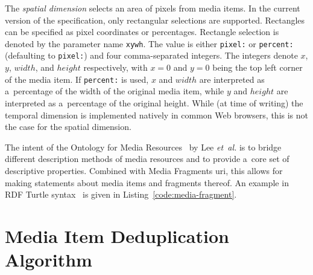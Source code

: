 \documentclass{article}
\begin{document}
The \emph{spatial dimension} selects an area of pixels from media items. In the current version of the specification, only rectangular selections are supported. Rectangles can be specified as pixel coordinates or percentages. Rectangle selection is denoted by the parameter name \texttt{xywh}. The value is either \texttt{pixel:} or \texttt{percent:} (defaulting to \texttt{pixel:}) and four comma-separated integers. The integers denote $x$, $y$, $width$, and $height$ respectively, with $x = 0$ and $y = 0$ being the top left corner of the media item. If \texttt{percent:} is used,\linebreak
$x$ and $width$ are interpreted as a~percentage of the width of the original media item, while $y$ and $height$ are interpreted as a~percentage of the original height.
While (at time of writing) the temporal dimension is implemented natively in common Web browsers, this is not the case for the spatial dimension.

The intent of the Ontology for Media Resources~\cite{lee2012mediaontology} by Lee \emph{et~al.} is to bridge different description methods of media resources
and to provide a~core set of descriptive properties. Combined with Media Fragments {\sc uri}, this allows for making statements about media items and fragments thereof. An example in RDF Turtle syntax~\cite{prudhommeaux2013turtle} is given in Listing~\ref{code:media-fragment}.


\section{Media Item Deduplication Algorithm}
\label{sec:media-item-deduplication-algorithm}
\end{document}
